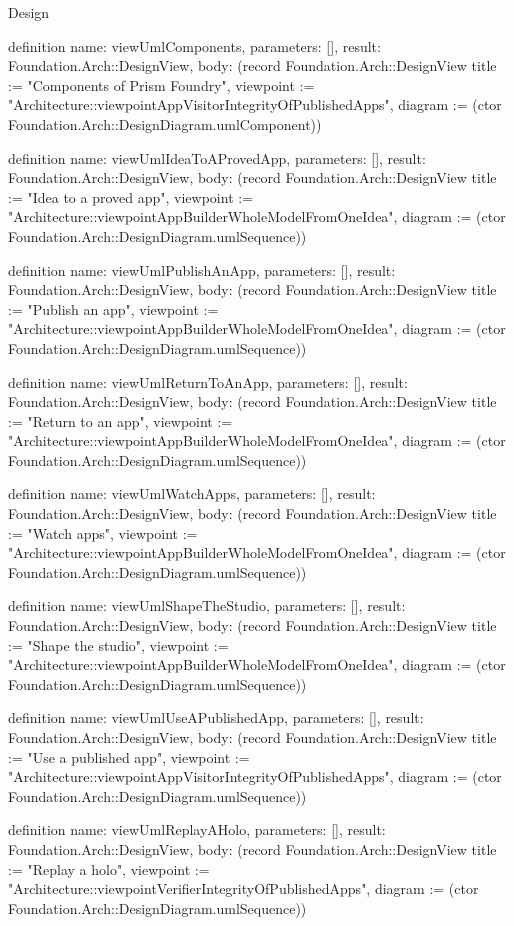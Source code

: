 \begin{lexlean}{Design}
\begin{semanticmodule}
definition{
  name: viewUmlComponents,
  parameters: [],
  result: Foundation.Arch::DesignView,
  body: (record Foundation.Arch::DesignView {title := "Components of Prism Foundry", viewpoint := "Architecture::viewpointAppVisitorIntegrityOfPublishedApps", diagram := (ctor Foundation.Arch::DesignDiagram.umlComponent)})
}

definition{
  name: viewUmlIdeaToAProvedApp,
  parameters: [],
  result: Foundation.Arch::DesignView,
  body: (record Foundation.Arch::DesignView {title := "Idea to a proved app", viewpoint := "Architecture::viewpointAppBuilderWholeModelFromOneIdea", diagram := (ctor Foundation.Arch::DesignDiagram.umlSequence)})
}

definition{
  name: viewUmlPublishAnApp,
  parameters: [],
  result: Foundation.Arch::DesignView,
  body: (record Foundation.Arch::DesignView {title := "Publish an app", viewpoint := "Architecture::viewpointAppBuilderWholeModelFromOneIdea", diagram := (ctor Foundation.Arch::DesignDiagram.umlSequence)})
}

definition{
  name: viewUmlReturnToAnApp,
  parameters: [],
  result: Foundation.Arch::DesignView,
  body: (record Foundation.Arch::DesignView {title := "Return to an app", viewpoint := "Architecture::viewpointAppBuilderWholeModelFromOneIdea", diagram := (ctor Foundation.Arch::DesignDiagram.umlSequence)})
}

definition{
  name: viewUmlWatchApps,
  parameters: [],
  result: Foundation.Arch::DesignView,
  body: (record Foundation.Arch::DesignView {title := "Watch apps", viewpoint := "Architecture::viewpointAppBuilderWholeModelFromOneIdea", diagram := (ctor Foundation.Arch::DesignDiagram.umlSequence)})
}

definition{
  name: viewUmlShapeTheStudio,
  parameters: [],
  result: Foundation.Arch::DesignView,
  body: (record Foundation.Arch::DesignView {title := "Shape the studio", viewpoint := "Architecture::viewpointAppBuilderWholeModelFromOneIdea", diagram := (ctor Foundation.Arch::DesignDiagram.umlSequence)})
}

definition{
  name: viewUmlUseAPublishedApp,
  parameters: [],
  result: Foundation.Arch::DesignView,
  body: (record Foundation.Arch::DesignView {title := "Use a published app", viewpoint := "Architecture::viewpointAppVisitorIntegrityOfPublishedApps", diagram := (ctor Foundation.Arch::DesignDiagram.umlSequence)})
}

definition{
  name: viewUmlReplayAHolo,
  parameters: [],
  result: Foundation.Arch::DesignView,
  body: (record Foundation.Arch::DesignView {title := "Replay a holo", viewpoint := "Architecture::viewpointVerifierIntegrityOfPublishedApps", diagram := (ctor Foundation.Arch::DesignDiagram.umlSequence)})
}


\end{semanticmodule}
\end{lexlean}
